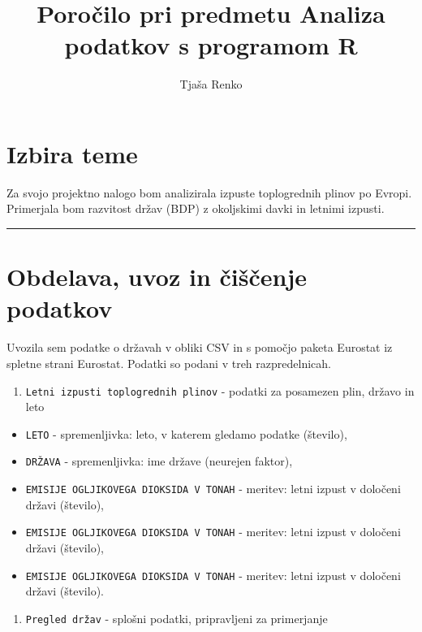 \documentclass[]{article}
\title{Poročilo pri predmetu Analiza podatkov s programom R}
\author{Tjaša Renko}
\date{}
\providecommand{\tightlist}{%
  \setlength{\itemsep}{0pt}\setlength{\parskip}{0pt}}
\begin{document}
\maketitle

\section{Izbira teme}\label{izbira-teme}

Za svojo projektno nalogo bom analizirala izpuste toplogrednih plinov po
Evropi. Primerjala bom razvitost držav (BDP) z okoljskimi davki in
letnimi izpusti.

\begin{center}\rule{0.5\linewidth}{\linethickness}\end{center}

\section{Obdelava, uvoz in čiščenje
podatkov}\label{obdelava-uvoz-in-ciscenje-podatkov}

Uvozila sem podatke o državah v obliki CSV in s pomočjo paketa Eurostat
iz spletne strani Eurostat. Podatki so podani v treh razpredelnicah.

\begin{enumerate}
\def\labelenumi{\arabic{enumi}.}
\tightlist
\item
  \texttt{Letni\ izpusti\ toplogrednih\ plinov} - podatki za posamezen
  plin, državo in leto
\end{enumerate}

\begin{itemize}
\tightlist
\item
  \texttt{LETO} - spremenljivka: leto, v katerem gledamo podatke
  (število),
\item
  \texttt{DRŽAVA} - spremenljivka: ime države (neurejen faktor),
\item
  \texttt{EMISIJE\ OGLJIKOVEGA\ DIOKSIDA\ V\ TONAH} - meritev: letni
  izpust v določeni državi (število),
\item
  \texttt{EMISIJE\ OGLJIKOVEGA\ DIOKSIDA\ V\ TONAH} - meritev: letni
  izpust v določeni državi (število),
\item
  \texttt{EMISIJE\ OGLJIKOVEGA\ DIOKSIDA\ V\ TONAH} - meritev: letni
  izpust v določeni državi (število).
\end{itemize}

\begin{enumerate}
\def\labelenumi{\arabic{enumi}.}
\setcounter{enumi}{1}
\tightlist
\item
  \texttt{Pregled\ držav} - splošni podatki, pripravljeni za primerjanje
\end{enumerate}
\end{document}
